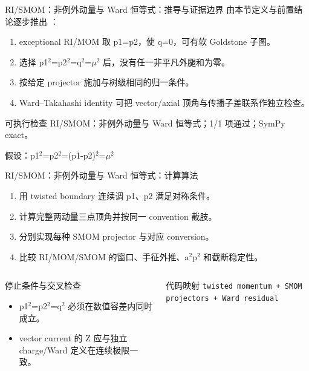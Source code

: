 \begin{frame}[t]{RI/\allowbreak{}SMOM：非例外动量与 Ward 恒等式：推导与证据边界}
\footnotesize
{}\quad 由本节定义与前置结论逐步推出 ：
\begin{enumerate}
\item exceptional RI/\allowbreak{}MOM 取 p1=p2，使 q=0，可有软 Goldstone 子图。
\item 选择 p1\ensuremath{^{2}}=p2\ensuremath{^{2}}=q\ensuremath{^{2}}=\ensuremath{\mu}\ensuremath{^{2}} 后，没有任一非平凡外腿和为零。
\item 按给定 projector 施加与树级相同的归一条件。
\item Ward--Takahashi identity 可把 vector/\allowbreak{}axial 顶角与传播子差联系作独立检查。
\end{enumerate}\begin{block}{可执行检查}
\quad RI/\allowbreak{}SMOM：非例外动量与 Ward 恒等式；1/1 项通过；SymPy exact。
\par\scriptsize 假设：p1\ensuremath{^{2}}=p2\ensuremath{^{2}}=(p1-p2)\ensuremath{^{2}}=\ensuremath{\mu}\ensuremath{^{2}}
\end{block}
\end{frame}

\begin{frame}[t]{RI/\allowbreak{}SMOM：非例外动量与 Ward 恒等式：计算算法}
\footnotesize
{}\begin{enumerate}
\item 用 twisted boundary 连续调 p1、p2 满足对称条件。
\item 计算完整两动量三点顶角并按同一 convention 截肢。
\item 分别实现每种 SMOM projector 与对应 conversion。
\item 比较 RI/\allowbreak{}MOM/\allowbreak{}SMOM 的窗口、手征外推、a\ensuremath{^{2}}p\ensuremath{^{2}} 和截断稳定性。
\end{enumerate}\begin{columns}[T,onlytextwidth]
\begin{block}{停止条件与交叉检查}\scriptsize\begin{itemize}
\item[\CheckMark] p1\ensuremath{^{2}}=p2\ensuremath{^{2}}=q\ensuremath{^{2}} 必须在数值容差内同时成立。
\item[\CheckMark] vector current 的 Z 应与独立 charge/\allowbreak{}Ward 定义在连续极限一致。
\end{itemize}\end{block}
\begin{block}{代码映射}
\scriptsize \texttt{twisted momentum + SMOM projectors + Ward residual}
\end{block}\end{columns}\end{frame}

